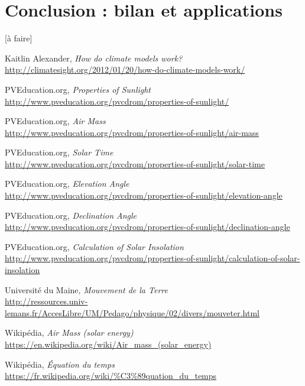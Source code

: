 \documentclass[12pt]{article}
\begin{document}
\clearpage
\section{Conclusion : bilan et applications}

[à faire]


\begin{thebibliography}{99}

	Kaitlin Alexander,
	\emph{How do climate models work?}\\
	\url{http://climatesight.org/2012/01/20/how-do-climate-models-work/}

	PVEducation.org,
	\emph{Properties of Sunlight}\\
	\url{http://www.pveducation.org/pvcdrom/properties-of-sunlight/}

	PVEducation.org,
	\emph{Air Mass}\\
	\url{http://www.pveducation.org/pvcdrom/properties-of-sunlight/air-mass}

	PVEducation.org,
	\emph{Solar Time}\\
	\url{http://www.pveducation.org/pvcdrom/properties-of-sunlight/solar-time}

	PVEducation.org,
	\emph{Elevation Angle}\\
	\url{http://www.pveducation.org/pvcdrom/properties-of-sunlight/elevation-angle}

	PVEducation.org,
	\emph{Declination Angle}\\
	\url{http://www.pveducation.org/pvcdrom/properties-of-sunlight/declination-angle}

	PVEducation.org,
	\emph{Calculation of Solar Insolation}\\
	\url{http://www.pveducation.org/pvcdrom/properties-of-sunlight/calculation-of-solar-insolation}

	Université du Maine,
	\emph{Mouvement de la Terre}\\
	\url{http://ressources.univ-lemans.fr/AccesLibre/UM/Pedago/physique/02/divers/mouveter.html}

	Wikipédia,
	\emph{Air Mass (solar energy)}\\
	\url{https://en.wikipedia.org/wiki/Air_mass_(solar_energy)}

	Wikipédia,
	\emph{Équation du temps}\\
	\url{https://fr.wikipedia.org/wiki/%C3%89quation_du_temps}
	

\end{thebibliography}
\end{document}

